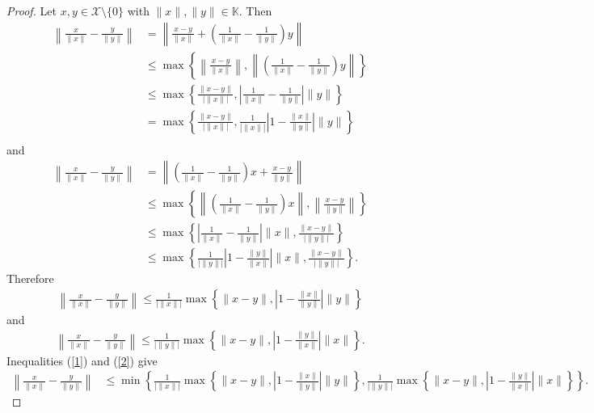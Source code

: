 \documentclass{amsart}
\begin{document}
\begin{proof}
	Let $x, y \in \mathcal{X}\setminus\{0\}$ with $\|x\|, \|y\| \in \mathbb{K}$. Then 
		\begin{align*}
	 \left\|\frac{x}{\|x\|}-\frac{y}{\|y\|}\right\|&= \left\|\frac{x-y}{\|x\|}+\left(\frac{1}{\|x\|}-\frac{1}{\|y\|}\right)y\right\|\\
	 &\leq \max \left\{\left\|\frac{x-y}{\|x\|}\right\|, \left\|\left(\frac{1}{\|x\|}-\frac{1}{\|y\|}\right)y\right\|\right\}\\
	  &\leq \max \left\{\frac{\|x-y\|}{\big|\|x\|\big|}, \left|\frac{1}{\|x\|}-\frac{1}{\|y\|}\right|\|y\|\right\}\\
	  &= \max \left\{\frac{\|x-y\|}{\big|\|x\|\big|}, \frac{1}{\left|\|x\|\right|}\left|1-\frac{\|x\|}{\|y\|}\right|\|y\|\right\}\\
	\end{align*}
and 
\begin{align*}
 \left\|\frac{x}{\|x\|}-\frac{y}{\|y\|}\right\|&= \left\|\left(\frac{1}{\|x\|}-\frac{1}{\|y\|}\right)x+\frac{x-y}{\|y\|}\right\|\\
&\leq \max \left\{\left\|\left(\frac{1}{\|x\|}-\frac{1}{\|y\|}\right)x\right\|, \left\|\frac{x-y}{\|y\|}\right\|\right\}\\
&\leq \max \left\{\left|\frac{1}{\|x\|}-\frac{1}{\|y\|}\right|\|x\|, \frac{\|x-y\|}{\big|\|y\|\big|}\right\}\\
&\leq \max \left\{\frac{1}{\big|\|y\|\big|}\left|1-\frac{\|y\|}{\|x\|}\right|\|x\|, \frac{\|x-y\|}{\big|\|y\|\big|}\right\}.
\end{align*}
Therefore 
\begin{align}\label{1}
 \left\|\frac{x}{\|x\|}-\frac{y}{\|y\|}\right\|\leq \frac{1}{\big|\|x\|\big|}\max\left\{\|x-y\|, \left|1-\frac{\|x\|}{\|y\|}\right|\|y\|\right\}
\end{align}
and 
\begin{align}\label{2}
	\left\|\frac{x}{\|x\|}-\frac{y}{\|y\|}\right\|\leq \frac{1}{\big|\|y\|\big|}\max\left\{\|x-y\|, \left|1-\frac{\|y\|}{\|x\|}\right|\|x\|\right\}.
\end{align}
Inequalities (\ref{1}) and  (\ref{2}) give 
\begin{align*}
	\left\|\frac{x}{\|x\|}-\frac{y}{\|y\|}\right\|&\leq\min \left\{\frac{1}{\big|\|x\|\big|}\max\left\{\|x-y\|, \left|1-\frac{\|x\|}{\|y\|}\right|\|y\|\right\}, \frac{1}{\big|\|y\|\big|}\max\left\{\|x-y\|, \left|1-\frac{\|y\|}{\|x\|}\right|\|x\|\right\}\right\}.
\end{align*}
\end{proof}
\end{document}
